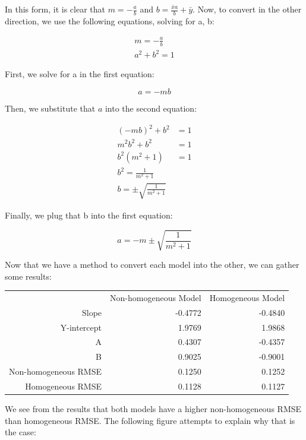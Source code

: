 \documentclass{article}
\begin{document}
In this form, it is clear that $m = -\frac{a}{b}$ and $b = \frac{\bar{x} a}{b} + \bar{y}$. 
Now, to convert in the other direction, we use the following equations, solving 
for a, b:

\begin{align*}
m = -\frac{a}{b} \\
a^2 + b^2 = 1
\end{align*}

First, we solve for a in the first equation:

$$
a = -m b
$$

Then, we substitute that $a$ into the second equation:

\begin{align*}
(-m b)^2 + b^2 &= 1 \\
m^2 b^2 + b^2 &= 1 \\
b^2 (m^2 + 1) &= 1 \\
b^2 = \frac{1}{m^2 + 1} \\
b = \pm \sqrt{\frac{1}{m^2 + 1}}
\end{align*}

Finally, we plug that b into the first equation:

$$
a = -m \pm \sqrt{\frac{1}{m^2 + 1}}
$$

Now that we have a method to convert each model into the other, we can gather 
some results:

\begin{tabular}{r | r r}
                         & Non-homogeneous Model & Homogeneous Model \\
          Slope          &         -0.4772       &           -0.4840 \\
    Y-intercept          &          1.9769       &            1.9868 \\
              A          &          0.4307       &           -0.4357 \\
              B          &          0.9025       &           -0.9001 \\
    Non-homogeneous RMSE &          0.1250       &            0.1252 \\
        Homogeneous RMSE &          0.1128       &            0.1127 \\
\end{tabular}

We see from the results that both models have a higher non-homogeneous RMSE than 
homogeneous RMSE. The following figure attempts to explain why that is the case:
\end{document}
